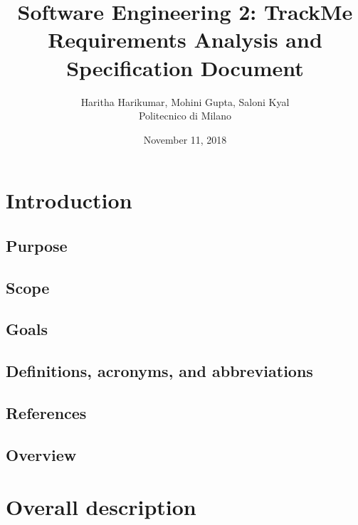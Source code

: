 \documentclass[12pt, a4paper]{report}
\begin{document}
\title{Software Engineering 2: TrackMe \\ \vspace{1em} Requirements Analysis and Specification Document}
\author{Haritha Harikumar, Mohini Gupta, Saloni Kyal\\
Politecnico di Milano}
\date{November 11, 2018}
\maketitle
\tableofcontents

\chapter{Introduction}
\label{ch:introduction}

\section{Purpose}


\section{Scope}


\section{Goals}


\section{Definitions, acronyms, and abbreviations}


\section{References}


\section{Overview}


\chapter{Overall description}
\label{ch:overall-desc}
\end{document}
